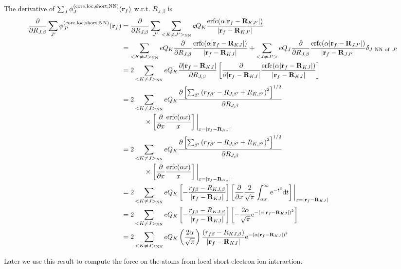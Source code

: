 \documentclass[paper=a4, fontsize=11pt]{article} %
\numberwithin{equation}{section} %
\numberwithin{figure}{section} %
\numberwithin{table}{section} %
\newcommand{\p}{\partial}
\newcommand{\br}{{\bf{r}}}
\newcommand{\bR}{{\bf{R}}}
\newcommand{\rcore}{{\mathrm{core}}}
\newcommand{\rNN}{{\mathrm{NN}}}
\newcommand{\re}{{\mathrm{e}}}
\newcommand{\rshort}{{\mathrm{short}}}
\newcommand{\rerfc}{{\mathrm{erfc}}}
\newcommand{\rd}{{\mathrm{d}}}
\newcommand{\rlo}{{\mathrm{loc}}}
\newcommand{\al}{{\alpha}}
\newcommand{\RJb}{{R_{J,\beta}}}
\begin{document}
The derivative of $\sum_J \phi_J^{(\rcore,\rlo,\rshort,\rNN)}(\br_f)$ w.r.t. $\RJb$ is 
\begin{equation}\label{eq:dphishortNNdR}
\begin{split}
\frac{\p }{\p \RJb}\sum_{J'} \phi_{J'}^{(\rcore,\rlo,\rshort,\rNN)}(\br_f)
&= \frac{\p }{\p \RJb} \sum_{J'} \sum_{<K \neq J'>_{\rNN}}eQ_K\frac{\rerfc(\alpha|\br_f-\bR_{KJ'}|)}{|\br_f-\bR_{KJ'}|} \\
&= \sum_{<K\neq J>_{\rNN}}eQ_K\frac{\p }{\p \RJb}\frac{\rerfc(\alpha|\br_f-\bR_{KJ}|)}{|\br_f-\bR_{KJ}|} + \sum_{<J \neq J'>}eQ_J\frac{\p }{\p \RJb}\frac{\rerfc(\alpha|\br_f-\bR_{JJ'}|)}{|\br_f-\bR_{JJ'}|}\delta_{J\ \rNN\ \mathrm{of}\ J'} \\
&= 2 \sum_{<K\neq J>_{\rNN}}eQ_K \frac{\p |\br_f-\bR_{KJ}|}{\p \RJb} \left[\frac{\p} {\p |\br_f-\bR_{KJ}|} \frac{\rerfc(\alpha|\br_f-\bR_{KJ}|)}{|\br_f-\bR_{KJ}|}\right]\\
&= 2\sum_{<K\neq J>_{\rNN}}eQ_K \frac{\p \left[ \sum_{\beta'} \left(r_{f\beta'}-R_{J,\beta'}+R_{K,\beta'}\right)^2\right]^{1/2}}{\p \RJb}\\
&\ \ \ \ \ \ \ \ \ \ \times \left[\frac{\p} {\p x} \frac{\rerfc(\alpha x)}{x}\right]\bigg|_{x=|\br_f-\bR_{KJ}|}\\
&= 2\sum_{<K\neq J>_{\rNN}}eQ_K \frac{\p \left[ \sum_{\beta'} \left(r_{f\beta'}-R_{J,\beta'}+R_{K,\beta'}\right)^2\right]^{1/2}}{\p \RJb}\\
&\ \ \ \ \ \ \ \ \ \ \times \left[\frac{\p} {\p x} \frac{\rerfc(\alpha x)}{x}\right]\bigg|_{x=|\br_f-\bR_{KJ}|}\\
&= 2\sum_{<K\neq J>_{\rNN}}eQ_K \left[-\frac{r_{f\beta}-R_{KJ,\beta}}{|\br_f-\bR_{KJ}|}\right]\left[\frac{\p}{\p x} \frac{2}{\sqrt{\pi}}\int_{\al x}^{\infty} \re^{-t^2} \rd t\right]\bigg|_{x=|\br_f-\bR_{KJ}|}\\
&= 2\sum_{<K\neq J>_{\rNN}}eQ_K \left[-\frac{r_{f\beta}-R_{KJ,\beta}}{|\br_f-\bR_{KJ}|}\right]\left[-\frac{2\al}{\sqrt{\pi}}\re^{-(\alpha|\br_f-\bR_{KJ}|)^2}\right]\\
&= 2\sum_{<K\neq J>_{\rNN}}eQ_K \left(\frac{2\al}{\sqrt{\pi}} \right)\frac{\left(r_{f\beta}-R_{KJ,\beta}\right)}{|\br_f-\bR_{KJ}|}\re^{-(\alpha|\br_f-\bR_{KJ}|)^2}\\
\end{split}
\end{equation}

Later we use this result to compute the force on the atoms from local short electron-ion interaction.
\end{document}
